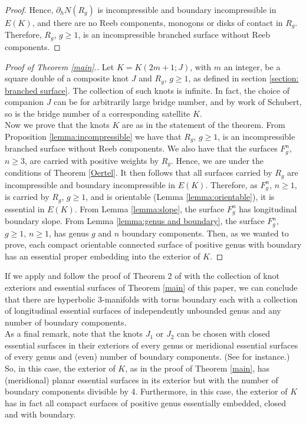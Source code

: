 \documentclass[reqno]{amsart}
\theoremstyle{definition}
\theoremstyle{remark}
\begin{document}
\begin{proof}
Hence, $\partial_h N(R_g)$ is incompressible and boundary incompressible in $E(K)$, and there are no Reeb components,  monogons or disks of contact  in $R_g$.  Therefore, $R_g$,  $g\geq 1$, is an incompressible branched surface without Reeb components.
\end{proof}





\begin{proof}[Proof of Theorem \ref{main}.]
Let $K=K(2m+1; J)$, with $m$ an integer,  be a square double of a composite knot $J$ and $R_g$, $g\geq 1$,  as defined in section \ref{section: branched surface}.  The collection of such knots is infinite.  In fact,  the choice of companion $J$ can be for arbitrarily large bridge number,  and by work of Schubert,  so is the bridge number of a corresponding satellite $K$.\\
Now we prove that the knots $K$ are as in the statement of the theorem.  From Proposition \ref{lemma:incompressible} we have that $R_g$, $g\geq 1$, is an incompressible branched surface without Reeb components.  We also have that the surfaces $F_g^n$, $n\geq 3$, are carried with positive weights by $R_g$. Hence, we are under the conditions of Theorem \ref{Oertel}.  It then follows that all surfaces carried by $R_g$ are incompressible and boundary incompressible in $E(K)$. Therefore, as $F_g^n$, $n\geq 1$,  is carried by $R_g$, $g\geq 1$, and is orientable (Lemma \ref{lemma:orientable}),  it is essential in $E(K)$. From Lemma \ref{lemma:slope}, the surface $F_g^n$ has longitudinal boundary slope. From Lemma \ref{lemma:genus and boundary}, the surface $F_g^n$, $g\geq 1,\, n\geq 1$,  has genus $g$ and $n$  boundary components. Then,  as we wanted to prove,  each compact orientable connected surface of positive genus with boundary has an essential proper embedding into the exterior of $K$.
\end{proof}


If we apply and follow the proof of Theorem 2 of \cite{N-18} with the collection of knot exteriors and essential surfaces of Theorem \ref{main} of this paper,  we can conclude that there are hyperbolic 3-manifolds with torus boundary each with a collection of longitudinal essential surfaces of independently unbounded genus and any number of boundary components.\\ 
As a final remark,  note that the knots $J_1$ or $J_2$ can be chosen with closed essential surfaces in their exteriors of every genus or meridional essential surfaces of every genus and (even) number of boundary components.  (See \cite{N-18} for instance.) So,  in this case,  the exterior of $K$,  as in the proof of Theorem \ref{main},  has (meridional) planar essential surfaces in its exterior but with the number of boundary components divisible by 4.  Furthermore,  in this case,  the exterior of $K$ has in fact all compact surfaces of positive genus essentially embedded, closed and with boundary.  
\end{document}
